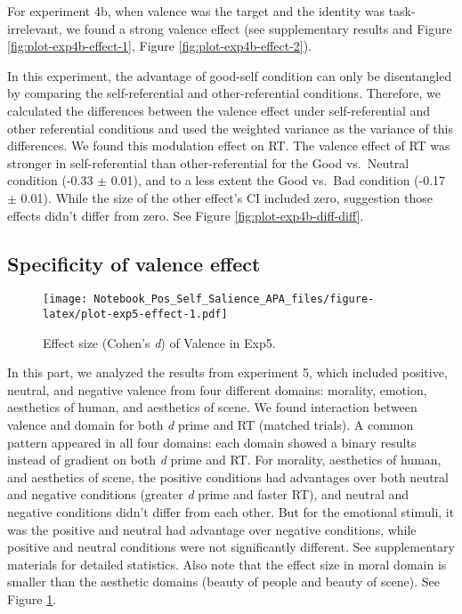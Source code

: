 \documentclass[
  english,
  man]{apa6}
\begin{document}
For experiment 4b, when valence was the target and the identity was task-irrelevant, we found a strong valence effect (see supplementary results and Figure \ref{fig:plot-exp4b-effect-1}, Figure \ref{fig:plot-exp4b-effect-2}).

In this experiment, the advantage of good-self condition can only be disentangled by comparing the self-referential and other-referential conditions. Therefore, we calculated the differences between the valence effect under self-referential and other referential conditions and used the weighted variance as the variance of this differences. We found this modulation effect on RT. The valence effect of RT was stronger in self-referential than other-referential for the Good vs.~Neutral condition (-0.33 \(\pm\) 0.01), and to a less extent the Good vs.~Bad condition (-0.17 \(\pm\) 0.01). While the size of the other effect's CI included zero, suggestion those effects didn't differ from zero. See Figure \ref{fig:plot-exp4b-diff-diff}.

\hypertarget{specificity-of-valence-effect}{%
\subsection{Specificity of valence effect}\label{specificity-of-valence-effect}}

\begin{figure}
\centering
\texttt{[image: Notebook\_Pos\_Self\_Salience\_APA\_files/figure-latex/plot-exp5-effect-1.pdf]}
\caption{\label{fig:plot-exp5-effect}Effect size (Cohen's \emph{d}) of Valence in Exp5.}
\end{figure}

In this part, we analyzed the results from experiment 5, which included positive, neutral, and negative valence from four different domains: morality, emotion, aesthetics of human, and aesthetics of scene. We found interaction between valence and domain for both \emph{d} prime and RT (matched trials). A common pattern appeared in all four domains: each domain showed a binary results instead of gradient on both \emph{d} prime and RT. For morality, aesthetics of human, and aesthetics of scene, the positive conditions had advantages over both neutral and negative conditions (greater \emph{d} prime and faster RT), and neutral and negative conditions didn't differ from each other. But for the emotional stimuli, it was the positive and neutral had advantage over negative conditions, while positive and neutral conditions were not significantly different. See supplementary materials for detailed statistics. Also note that the effect size in moral domain is smaller than the aesthetic domains (beauty of people and beauty of scene). See Figure \ref{fig:plot-exp5-effect}.
\end{document}
